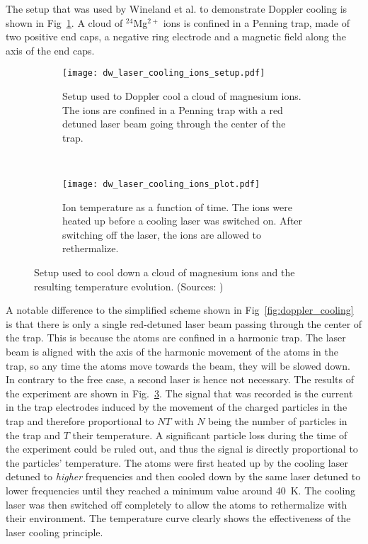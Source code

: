 The setup that was used by Wineland et al. to demonstrate Doppler cooling is
shown in Fig~\ref{fig:cooling_setup}. A cloud of $^{24}$Mg$^{2+}$ ions is confined
in a Penning trap, made of two positive end caps, a negative ring electrode and a
magnetic field along the axis of the end caps.
\begin{figure}[t]
  \centering
  \begin{subfigure}[t]{0.48\linewidth} 
    \centering
    \texttt{[image: dw\_laser\_cooling\_ions\_setup.pdf]}
    \caption{Setup used to Doppler cool a  cloud of magnesium ions. The ions are
    confined in a Penning trap with a red detuned laser beam going through
  the center of the trap.}
    \label{fig:cooling_setup}
  \end{subfigure}
  ~
  \begin{subfigure}[t]{0.48\linewidth} 
    \centering
    \texttt{[image: dw\_laser\_cooling\_ions\_plot.pdf]}
    \caption{Ion temperature as a function of time. The ions were heated up
    before a cooling laser was switched on. After switching off the laser, the
  ions are allowed to rethermalize.}
    \label{fig:cooling_results}
  \end{subfigure}
  \caption{Setup used to cool down a cloud of magnesium ions and the resulting
    temperature evolution. (Sources: \cite{wineland2012nobel,wineland1978radiation})}
\end{figure}
A notable difference to the simplified scheme shown in
Fig~\ref{fig:doppler_cooling} is that there is only a single red-detuned laser
beam passing through the center of the trap. This is because the atoms are
confined in a harmonic trap. The laser beam is aligned with the axis of the
harmonic movement of the atoms in the trap, so any time the atoms move towards
the beam, they will be slowed down. In contrary to the free case, a second laser
is hence not necessary. The results of the experiment are shown in
Fig.~\ref{fig:cooling_results}. The signal that was recorded is the current
in the trap electrodes induced by the movement of the charged particles in the
trap and therefore proportional to $NT$ with $N$ being the number of particles
in the trap and $T$ their temperature. A significant particle loss during the
time of the experiment could be ruled out, and thus the signal is directly
proportional to the particles' temperature. The atoms were first heated up by
the cooling laser detuned to {\em higher} frequencies and then cooled down by
the same laser detuned to lower frequencies until they reached a minimum value
around \SI{40}{K}. The cooling laser was then switched off completely to allow
the atoms to rethermalize with their environment. The temperature curve clearly
shows the effectiveness of the laser cooling principle.

